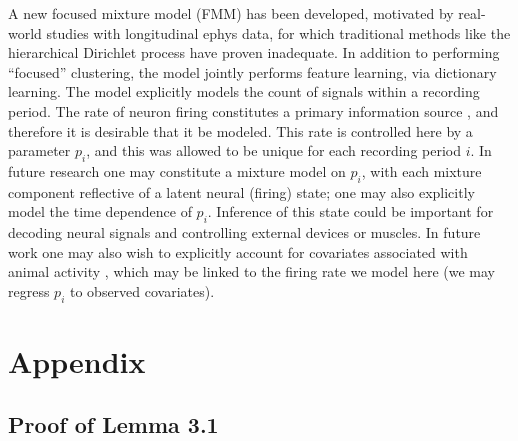 \documentclass[journal]{IEEEtran}
\begin{document}
A new focused mixture model (FMM) has been developed, motivated by real-world studies with longitudinal ephys data, for which traditional methods like the hierarchical Dirichlet process have proven inadequate. In addition to performing ``focused'' clustering, the model jointly performs feature learning, via dictionary learning. The model explicitly models the count of signals within a recording period. The rate of neuron firing constitutes a primary information source \cite{Donoghue07}, and therefore it is desirable that it be modeled. This rate is controlled here by a parameter $p_i$, and this was allowed to be unique for each recording period $i$. In future research one may constitute a mixture model on $p_i$, with each mixture component reflective of a latent neural (firing) state; one may also explicitly model the time dependence of $p_i$. Inference of this state could be important for decoding neural signals and controlling external devices or muscles. In future work one may also wish to explicitly account for covariates associated with animal activity \cite{Ventura}, which may be linked to the firing rate we model here (we may regress $p_i$ to observed covariates). 

\section*{Appendix}

\subsection{Proof of Lemma 3.1}
\end{document}
